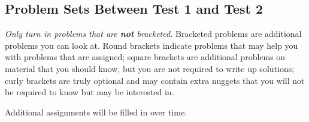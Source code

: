 \documentclass{scrartcl}
\begin{document}
\pagestyle{fancy}

\chead{}
\rhead{\thepage/\pageref{end}}
\lfoot{}
\rfoot{}

\begin{center}
  \large
%
%
\subsection*{Problem Sets Between Test 1 and Test 2}

\end{center}


\textit{Only turn in problems that are \textbf{not} bracketed.}
Bracketed problems are additional problems you can look at.
Round brackets indicate problems that may help you with problems that
are assigned; square brackets are additional problems on material
that you should know, but you are not required to write up solutions;
curly brackets are truly optional and may contain extra nuggets that you
will not be required to know but may be interested in.

Additional assignments will be filled in over time.

\bigskip
\end{document}
